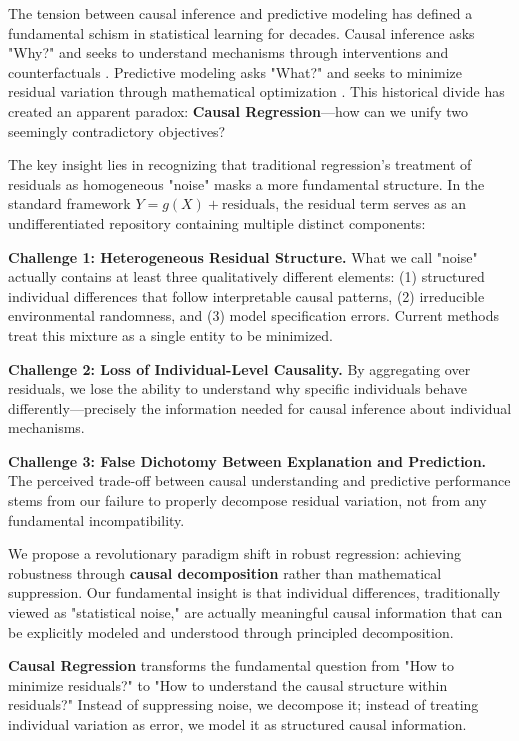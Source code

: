 \documentclass[conference]{IEEEtran}
\begin{document}
The tension between causal inference and predictive modeling has defined a fundamental schism in statistical learning for decades. Causal inference asks "Why?" and seeks to understand mechanisms through interventions and counterfactuals \cite{pearl2009causality}. Predictive modeling asks "What?" and seeks to minimize residual variation through mathematical optimization \cite{hastie2009elements}. This historical divide has created an apparent paradox: \textbf{Causal Regression}—how can we unify two seemingly contradictory objectives?

The key insight lies in recognizing that traditional regression's treatment of residuals as homogeneous "noise" masks a more fundamental structure. In the standard framework $Y = g(X) + \text{residuals}$, the residual term serves as an undifferentiated repository containing multiple distinct components:

\textbf{Challenge 1: Heterogeneous Residual Structure.} What we call "noise" actually contains at least three qualitatively different elements: (1) structured individual differences that follow interpretable causal patterns, (2) irreducible environmental randomness, and (3) model specification errors. Current methods treat this mixture as a single entity to be minimized.

\textbf{Challenge 2: Loss of Individual-Level Causality.} By aggregating over residuals, we lose the ability to understand why specific individuals behave differently—precisely the information needed for causal inference about individual mechanisms.

\textbf{Challenge 3: False Dichotomy Between Explanation and Prediction.} The perceived trade-off between causal understanding and predictive performance stems from our failure to properly decompose residual variation, not from any fundamental incompatibility.

We propose a revolutionary paradigm shift in robust regression: achieving robustness through \textbf{causal decomposition} rather than mathematical suppression. Our fundamental insight is that individual differences, traditionally viewed as "statistical noise," are actually meaningful causal information that can be explicitly modeled and understood through principled decomposition.

\textbf{Causal Regression} transforms the fundamental question from "How to minimize residuals?" to "How to understand the causal structure within residuals?" Instead of suppressing noise, we decompose it; instead of treating individual variation as error, we model it as structured causal information.
\end{document}
